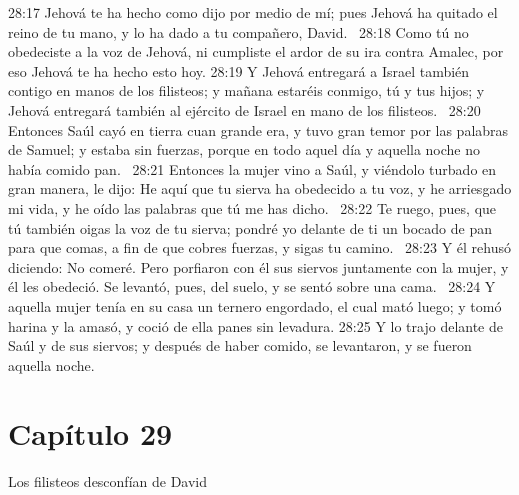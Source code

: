 28:17 Jehová te ha hecho como dijo por medio de mí; pues Jehová ha quitado el reino de tu mano, y lo ha dado a tu compañero, David.  
28:18 Como tú no obedeciste a la voz de Jehová, ni cumpliste el ardor de su ira contra Amalec, por eso Jehová te ha hecho esto hoy. 
28:19 Y Jehová entregará a Israel también contigo en manos de los filisteos; y mañana estaréis conmigo, tú y tus hijos; y Jehová entregará también al ejército de Israel en mano de los filisteos.  
28:20 Entonces Saúl cayó en tierra cuan grande era, y tuvo gran temor por las palabras de Samuel; y estaba sin fuerzas, porque en todo aquel día y aquella noche no había comido pan.  
28:21 Entonces la mujer vino a Saúl, y viéndolo turbado en gran manera, le dijo: He aquí que tu sierva ha obedecido a tu voz, y he arriesgado mi vida, y he oído las palabras que tú me has dicho.  
28:22 Te ruego, pues, que tú también oigas la voz de tu sierva; pondré yo delante de ti un bocado de pan para que comas, a fin de que cobres fuerzas, y sigas tu camino.  
28:23 Y él rehusó diciendo: No comeré. Pero porfiaron con él sus siervos juntamente con la mujer, y él les obedeció. Se levantó, pues, del suelo, y se sentó sobre una cama.  
28:24 Y aquella mujer tenía en su casa un ternero engordado, el cual mató luego; y tomó harina y la amasó, y coció de ella panes sin levadura. 
28:25 Y lo trajo delante de Saúl y de sus siervos; y después de haber comido, se levantaron, y se fueron aquella noche.  
\section*{Capítulo 29}
Los filisteos desconfían de David  

